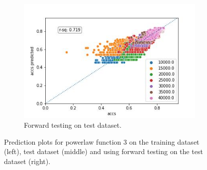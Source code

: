 \documentclass{article} %
\begin{document}
\begin{figure}
    \begin{subfigure}{.33\textwidth}
        \centering
        \includegraphics[width=.8\linewidth]{cifar10/powerlaw_all_epochs_accs_hat_total_n_arctan_epoch_arctan_val_forward_testing.jpg}
        \caption{Forward testing on test dataset.}
        \label{fig:powerlaw_acc_total_n_arctan_epoch_arctan_forward_val}
    \end{subfigure}
    \caption{Prediction plots for powerlaw function 3 on the training dataset (left), test dataset (middle) and using forward testing on the test dataset (right).}
    \label{fig:powerlaw_prediction_plot_fct_3}
\end{figure}



\end{document}

